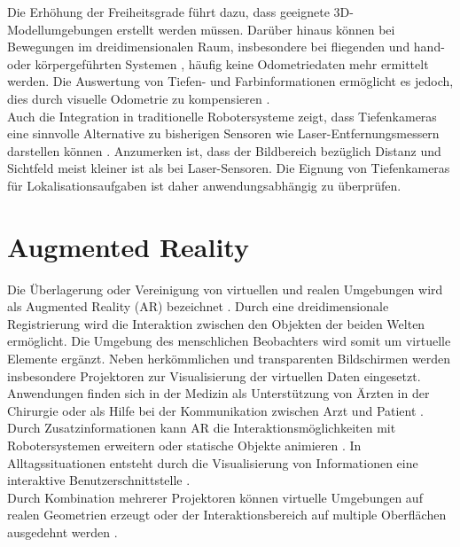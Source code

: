 Die Erhöhung der Freiheitsgrade führt dazu, dass geeignete 3D-Modellumgebungen erstellt werden müssen. Darüber hinaus können bei Bewegungen im dreidimensionalen Raum, insbesondere bei fliegenden \cite{Huang2011} und hand- oder körpergeführten Systemen \cite{Fallon2012}, häufig keine Odometriedaten mehr ermittelt werden. Die Auswertung von Tiefen- und Farbinformationen ermöglicht es jedoch, dies durch  visuelle Odometrie zu kompensieren \cite{Whelan2013robust}.\\

Auch die Integration in traditionelle Robotersysteme zeigt, dass Tiefenkameras eine sinnvolle Alternative zu bisherigen Sensoren wie Laser-Entfernungsmessern darstellen können \cite{Cunha2011} \cite{Eriksson2012}. Anzumerken ist, dass der \red[beobachtbare] Bildbereich bezüglich Distanz und Sichtfeld meist kleiner ist als bei Laser-Sensoren. Die Eignung von Tiefenkameras für Lokalisationsaufgaben ist daher anwendungsabhängig zu überprüfen.\\


\section{Augmented Reality}
Die Überlagerung oder Vereinigung von virtuellen und realen Umgebungen wird als Augmented Reality (AR) bezeichnet \cite{Azuma1997}. Durch eine dreidimensionale Registrierung wird die Interaktion zwischen den Objekten der beiden Welten ermöglicht. Die Umgebung des menschlichen Beobachters wird somit um virtuelle Elemente ergänzt. Neben herkömmlichen und transparenten Bildschirmen  werden insbesondere Projektoren zur Visualisierung der virtuellen Daten eingesetzt.\\

Anwendungen finden sich in der Medizin als Unterstützung von Ärzten in der Chirurgie \cite{Gavaghan2012} \cite{Hoppe2001} oder als Hilfe bei der Kommunikation zwischen Arzt und Patient \cite{Bluteau2005}. Durch Zusatzinformationen kann AR die Interaktionsmöglichkeiten mit Robotersystemen erweitern \cite{DeTommaso2012} oder statische Objekte animieren \cite{Raskar1999}. In Alltagssituationen entsteht durch die Visualisierung von Informationen eine interaktive Benutzerschnittstelle \cite{Linder2010} \cite{Huber2012}.\\
Durch Kombination mehrerer Projektoren können virtuelle Umgebungen auf realen Geometrien erzeugt \cite{Low2001} oder der Interaktionsbereich auf multiple Oberflächen ausgedehnt werden \cite{Wilson2010}.

